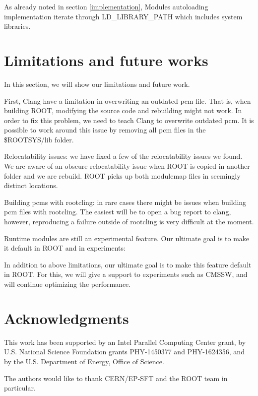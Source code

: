 \documentclass{webofc}
\begin{document}
As already noted in section \ref{implementation}, Modules autoloading implementation iterate through LD\_LIBRARY\_PATH which includes system libraries.

\section{Limitations and future works}
\label{limitationsandfuture}

In this section, we will show our limitations and future work.

First, Clang have a limitation in overwriting an outdated pcm file. That is, when building ROOT, modifying the source code and rebuilding might not work. In order to fix this problem, we need to teach Clang to overwrite outdated pcm. It is possible to work around this issue by removing all pcm files in the \$ROOTSYS/lib folder.

Relocatability issues: we have fixed a few of the relocatability issues we
found. We are aware of an obscure relocatability issue when ROOT is copied in another folder and we are rebuild. ROOT picks up both modulemap files in seemingly distinct locations.

Building pcms with rootcling: in rare cases there might be issues when building pcm files with rootcling. The easiest will be to open a bug report to clang, however, reproducing a failure outside of rootcling is very difficult at the moment.

Runtime modules are still an experimental feature. Our ultimate goal is to make it default in ROOT and in experiments:

In addition to above limitations, our ultimate goal is to make this feature default in ROOT. For this, we will give a support to experiments such as CMSSW, and will continue optimizing the performance.

\section{Acknowledgments}

This work has been supported by an Intel Parallel Computing Center grant, by U.S. National Science Foundation grants PHY-1450377 and PHY-1624356, and by the U.S. Department of Energy, Office of Science.

The authors would like to thank CERN/EP-SFT and the ROOT team in particular.
\end{document}

